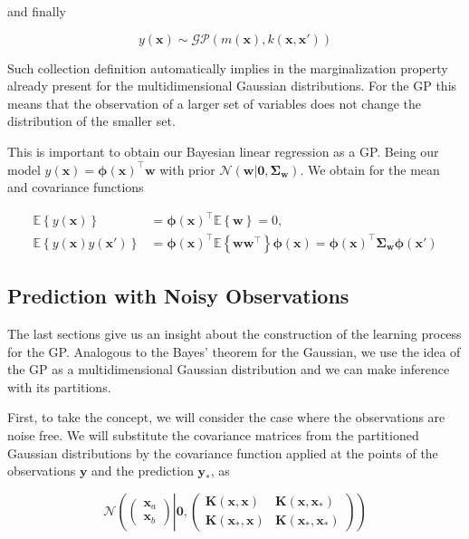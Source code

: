 \documentclass[11pt]{article} %
\begin{document}
and finally

\begin{equation}
   y(\mathbf{x}) \sim \mathcal{GP} \left( m(\mathbf{x}), k(\mathbf{x},\mathbf{x'}) \right)
\end{equation}

Such collection definition automatically implies in the marginalization property already present for the multidimensional Gaussian distributions. For the GP this means that the observation of a larger set of variables does not change the distribution of the smaller set.

This is important to obtain our Bayesian linear regression as a GP. Being our model $y(\mathbf{x})=\boldsymbol{\phi}(\mathbf{x})^\top \mathbf{w}$ with prior $\mathcal{N}\left( \mathbf{w} | \mathbf{0}, \boldsymbol{\Sigma}_{\mathbf{w}}\right)$. We obtain for the mean and covariance functions

\begin{equation}
   \label{eq:gau-pro-mean-cov}
   \begin{aligned}
      \mathbb{E}\left\{ y(\mathbf{x}) \right\} &= \boldsymbol{\phi}(\mathbf{x})^\top \mathbb{E} \left\{ \mathbf{w} \right\} = 0,\\
      \mathbb{E}\left\{ y(\mathbf{x})y(\mathbf{x'}) \right\} &= \boldsymbol{\phi}(\mathbf{x})^\top \mathbb{E} \left\{ \mathbf{ww}^\top \right\}\boldsymbol{\phi}(\mathbf{x}) = \boldsymbol{\phi}(\mathbf{x})^\top \boldsymbol{\Sigma}_{\mathbf{w}} \boldsymbol{\phi}(\mathbf{x'})
   \end{aligned}
\end{equation}

\subsection{Prediction with Noisy Observations}

The last sections give us an insight about the construction of the learning process for the GP. Analogous to the Bayes' theorem for the Gaussian, we use the idea of the GP as a multidimensional Gaussian distribution and we can make inference with its partitions. 

First, to take the concept, we will consider the case where the observations are noise free. We will substitute the covariance matrices from the partitioned Gaussian distributions by the covariance function applied at the points of the observations $\mathbf{y}$ and the prediction $\mathbf{y_*}$, as

\begin{equation}
   \mathcal{N} \left( \left( \begin{array}{c}{\mathbf{x}_{a}} \\ {\mathbf{x}_{b}}\end{array} \right) \left| \mathbf{0}, \left( \begin{array}{ll}{\mathbf{K}(\mathbf{x},\mathbf{x})} & {\mathbf{K}(\mathbf{x},\mathbf{x_*})} \\ {\mathbf{K}(\mathbf{x_*},\mathbf{x})} & {\mathbf{K}(\mathbf{x_*},\mathbf{x_*})}\end{array} \right) \right. \right)
\end{equation}
\end{document}
